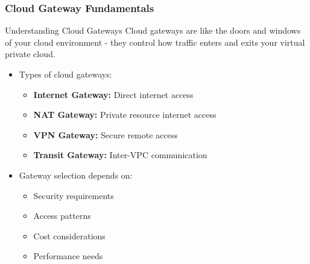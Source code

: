 \documentclass{beamer}
\begin{document}
\begin{frame}
    \frametitle{Cloud Gateway Fundamentals}
    
    \begin{block}{Understanding Cloud Gateways}
        Cloud gateways are like the doors and windows of your cloud environment - they control how traffic enters and exits your virtual private cloud.
    \end{block}
    
    \begin{itemize}
        \item Types of cloud gateways:
        \begin{itemize}
            \item \textbf{Internet Gateway:} Direct internet access
            \item \textbf{NAT Gateway:} Private resource internet access
            \item \textbf{VPN Gateway:} Secure remote access
            \item \textbf{Transit Gateway:} Inter-VPC communication
        \end{itemize}
        
        \item Gateway selection depends on:
        \begin{itemize}
            \item Security requirements
            \item Access patterns
            \item Cost considerations
            \item Performance needs
        \end{itemize}
    \end{itemize}
\end{frame}
\end{document}
